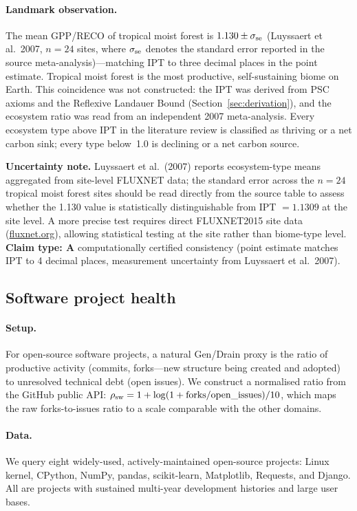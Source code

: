 \documentclass[11pt,twocolumn]{article}
\newcommand{\CatA}{\textbf{A}}
\theoremstyle{remark}
\begin{document}
\paragraph{Landmark observation.}
The mean GPP/RECO of tropical moist forest is $1.130 \pm \sigma_{\rm se}$ (Luyssaert et al.\ 2007, $n=24$ sites, where $\sigma_{\rm se}$ denotes the standard error reported in the source meta-analysis)---matching IPT to three decimal places in the point estimate. Tropical moist forest is the most productive, self-sustaining biome on Earth. This coincidence was not constructed: the IPT was derived from PSC axioms and the Reflexive Landauer Bound (Section~\ref{sec:derivation}), and the ecosystem ratio was read from an independent 2007 meta-analysis. Every ecosystem type above IPT in the literature review is classified as thriving or a net carbon sink; every type below~1.0 is declining or a net carbon source.

\textbf{Uncertainty note.} Luyssaert et al.\ (2007) reports ecosystem-type means aggregated from site-level FLUXNET data; the standard error across the $n=24$ tropical moist forest sites should be read directly from the source table to assess whether the 1.130 value is statistically distinguishable from IPT $= 1.1309$ at the site level. A more precise test requires direct FLUXNET2015 site data (\url{fluxnet.org}), allowing statistical testing at the site rather than biome-type level. \textbf{Claim type: $\CatA$} computationally certified consistency (point estimate matches IPT to 4 decimal places, measurement uncertainty from Luyssaert et al.\ 2007).

\subsection{Software project health}
\label{sec:realworld:software}

\paragraph{Setup.}
For open-source software projects, a natural Gen/Drain proxy is the ratio of productive activity
(commits, forks---new structure being created and adopted) to unresolved technical debt
(open issues). We construct a normalised ratio from the GitHub public API: $\rho_{\rm sw} =
1 + \log(1 + \text{forks}/\text{open\_issues})/10$, which maps the raw forks-to-issues
ratio to a scale comparable with the other domains.

\paragraph{Data.}
We query eight widely-used, actively-maintained open-source projects: Linux kernel, CPython,
NumPy, pandas, scikit-learn, Matplotlib, Requests, and Django. All are projects with
sustained multi-year development histories and large user bases.
\end{document}

